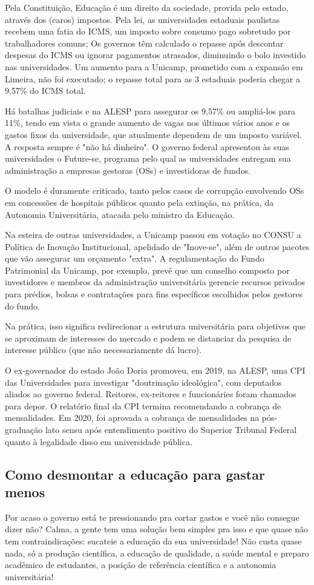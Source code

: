 Pela Constituição, Educação é um direito da sociedade, provida pelo estado, através  dos (caros) impostos. Pela lei, as universidades estaduais paulistas recebem uma fatia do  ICMS, um imposto sobre consumo pago sobretudo por trabalhadores comuns; 
Os governos têm calculado o repasse após descontar despesas do ICMS ou ignorar  pagamentos atrasados, diminuindo o bolo investido nas universidades. Um aumento  para a Unicamp, prometido com a expansão em Limeira, não foi executado; o repasse  total para as 3 estaduais poderia chegar a 9,57\% do ICMS total. 

Há batalhas judiciais e na ALESP para assegurar os 9,57\% ou ampliá-los para 11\%,  tendo em vista o grande aumento de vagas nos últimos vários anos e os gastos fixos da  universidade, que atualmente dependem de um imposto variável. A resposta sempre é  "não há dinheiro". O governo federal apresentou às suas universidades o Future-se,  programa pelo qual as universidades entregam sua administração a empresas gestoras  (OSs) e investidoras de fundos. 

O modelo é duramente criticado, tanto pelos casos de corrupção envolvendo OSs em  concessões de hospitais públicos quanto pela extinção, na prática, da Autonomia  Universitária, atacada pelo ministro da Educação. 

Na esteira de outras universidades, a Unicamp passou em votação no CONSU a  Política de Inovação Institucional, apelidado de "Inove-se", além de outros pacotes que  vão assegurar um orçamento "extra". A regulamentação do Fundo Patrimonial da  Unicamp, por exemplo, prevê que um conselho composto por investidores e membros da  administração universitária gerencie recursos privados para prédios, bolsas e  contratações para fins específicos escolhidos pelos gestores do fundo.

Na prática, isso significa redirecionar a estrutura universitária para objetivos que se  aproximam de interesses do mercado e podem se distanciar da pesquisa de interesse  público (que não necessariamente dá lucro).

O ex-governador do estado João Doria promoveu, em 2019, na ALESP, uma CPI das  Universidades para investigar "doutrinação ideológica", com deputados aliados ao  governo federal. Reitores, ex-reitores e funcionáries foram chamados para depor. O  relatório final da CPI termina recomendando a cobrança de mensalidades. Em 2020, foi  aprovada a cobrança de mensalidades na pós-graduação lato sensu após entendimento  positivo do Superior Tribunal Federal quanto à legalidade disso em universidade  pública. 

\subsection{Como desmontar a educação para gastar menos}

Por acaso o governo está te pressionando pra cortar gastos e você não consegue dizer não? Calma, a gente tem uma solução bem simples pra isso e que quase não tem  contraindicações: sucateie a educação da sua universidade! Não custa quase nada, só a  produção científica, a educação de qualidade, a saúde mental e preparo acadêmico de  estudantes, a posição de referência científica e a autonomia universitária!

